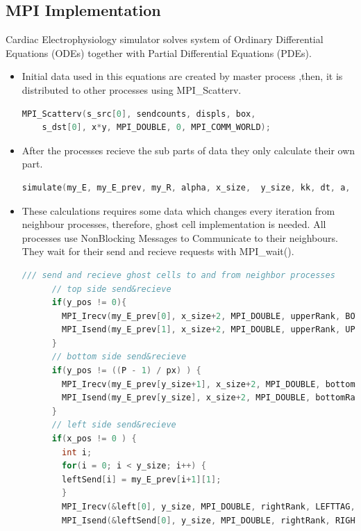 \documentclass{article}
\newcommand\tab[1][0.5cm]{\hspace*{#1}}
\begin{document}
\subsection{MPI Implementation}
\tab 
Cardiac Electrophysiology simulator solves system of Ordinary Differential Equations (ODEs) together with Partial Differential Equations (PDEs). 
\begin{itemize}
\item Initial data used in this equations are created by master process ,then, it is distributed to other processes using MPI\_Scatterv. 
\begin{lstlisting}[language=C]
    MPI_Scatterv(s_src[0], sendcounts, displs, box, 
    s_dst[0], x*y, MPI_DOUBLE, 0, MPI_COMM_WORLD);
\end{lstlisting}
\item After the processes recieve the sub parts of data they only calculate their own part. 
\begin{lstlisting}[language=C]
    simulate(my_E, my_E_prev, my_R, alpha, x_size,  y_size, kk, dt, a, epsilon, M1, M2, b, x_pos, y_pos, px, py);
\end{lstlisting}
\item These calculations requires some data which changes every iteration from neighbour processes, therefore, ghost cell implementation is needed. All processes use Non\-Blocking Messages to Communicate to their neighbours. They wait for their send and recieve requests with MPI\_wait().
\begin{lstlisting}[language=C]
    /// send and recieve ghost cells to and from neighbor processes 
      // top side send&recieve
      if(y_pos != 0){
        MPI_Irecv(my_E_prev[0], x_size+2, MPI_DOUBLE, upperRank, BOTTOMTAG, MPI_COMM_WORLD, &reqs[requestCount++]);
        MPI_Isend(my_E_prev[1], x_size+2, MPI_DOUBLE, upperRank, UPPERTAG, MPI_COMM_WORLD, &reqs[requestCount++]); 
      }
      // bottom side send&recieve
      if(y_pos != ((P - 1) / px) ) {
        MPI_Irecv(my_E_prev[y_size+1], x_size+2, MPI_DOUBLE, bottomRank, UPPERTAG, MPI_COMM_WORLD, &reqs[requestCount++]);
        MPI_Isend(my_E_prev[y_size], x_size+2, MPI_DOUBLE, bottomRank, BOTTOMTAG, MPI_COMM_WORLD, &reqs[requestCount++]); 
      }
      // left side send&recieve
      if(x_pos != 0 ) {
        int i; 
        for(i = 0; i < y_size; i++) {
        leftSend[i] = my_E_prev[i+1][1]; 
        }
        MPI_Irecv(&left[0], y_size, MPI_DOUBLE, rightRank, LEFTTAG, MPI_COMM_WORLD, &reqs[requestCount++]);
        MPI_Isend(&leftSend[0], y_size, MPI_DOUBLE, rightRank, RIGHTTAG, MPI_COMM_WORLD, &reqs[requestCount++]); 

\end{lstlisting}
\end{itemize}
\end{document}
